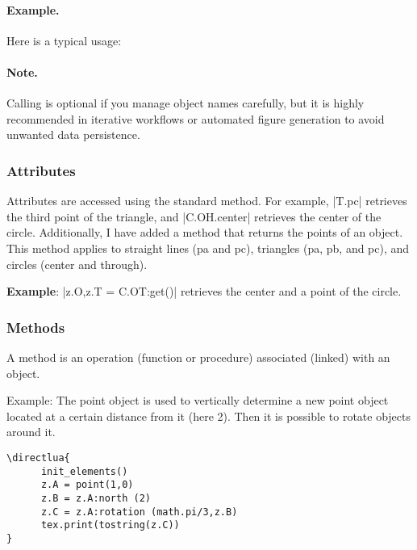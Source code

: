 \paragraph{Example.}
Here is a typical usage:

\begin{center}
  \begin{tkzexample}
  \end{tkzexample}
\end{center}

\paragraph{Note.}
Calling  is optional if you manage object names carefully, but it is highly recommended in iterative workflows or automated figure generation to avoid unwanted data persistence.



 \subsubsection{Attributes} %
 \label{ssub:attributes}
 
Attributes are accessed using the standard method. For example, |T.pc| retrieves the third point of the triangle, and |C.OH.center| retrieves the center of the circle. Additionally, I have added a method  that returns the points of an object. This method applies to straight lines (pa and pc), triangles (pa, pb, and pc), and circles (center and through).

\vspace{1em}
\noindent
  \textbf{Example}: |z.O,z.T = C.OT:get()| retrieves the center and a point of the circle.

\subsubsection{Methods} %
\label{ssub:methods}

A method is an operation (function or procedure) associated (linked) with an object.

Example:   The point object is used to vertically determine a new point object located at a certain distance from it (here 2). Then it is possible to rotate objects around it.

\begin{verbatim}
\directlua{
      init_elements()
      z.A = point(1,0)
      z.B = z.A:north (2)             
      z.C = z.A:rotation (math.pi/3,z.B)
      tex.print(tostring(z.C))
}
\end{verbatim}



\endinput